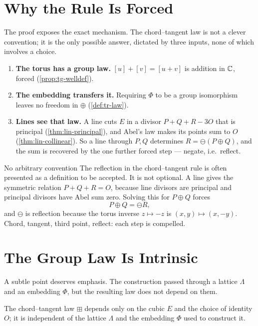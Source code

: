 \section{Why the Rule Is Forced}
\label{sec:tr-forced}

The proof exposes the exact mechanism. The chord--tangent law is not a clever
convention; it is the only possible answer, dictated by three inputs, none of
which involves a choice.

\begin{enumerate}
\item \textbf{The torus has a group law.} \([u]+[v]=[u+v]\) is addition in \(\mathbb{C}\),
  forced (\cref{prop:tg-welldef}).
\item \textbf{The embedding transfers it.} Requiring \(\Phi\) to be a group
  isomorphism leaves no freedom in \(\oplus\) (\cref{def:tr-law}).
\item \textbf{Lines see that law.} A line cuts \(E\) in a divisor \(P+Q+R-3O\)
  that is principal (\cref{thm:lin-principal}), and Abel's law makes its points
  sum to \(O\) (\cref{thm:lin-collinear}). So a line through \(P, Q\) determines
  \(R = \ominus(P \oplus Q)\), and the sum is recovered by the one further forced
  step --- negate, i.e.\ reflect.
\end{enumerate}

\begin{keyidea}{No arbitrary convention}
The reflection in the chord--tangent rule is often presented as a definition to be
accepted. It is not optional. A line gives the symmetric relation
\(P + Q + R = O\), because line divisors are principal and principal divisors have
Abel sum zero. Solving this for \(P \oplus Q\) forces
\[
  P \oplus Q = \ominus R,
\]
and \(\ominus\) is reflection because the torus inverse \(z \mapsto -z\) is
\((x,y) \mapsto (x,-y)\). Chord, tangent, third point, reflect: each step is
compelled.
\end{keyidea}

\section{The Group Law Is Intrinsic}
\label{sec:tr-intrinsic}

A subtle point deserves emphasis. The construction passed through a lattice
\(\Lambda\) and an embedding \(\Phi\), but the resulting law does not depend on
them.

\begin{proposition}
\label{prop:tr-intrinsic}
The chord--tangent law \(\boxplus\) depends only on the cubic \(E\) and the choice
of identity \(O\); it is independent of the lattice \(\Lambda\) and the embedding
\(\Phi\) used to construct it.
\end{proposition}

